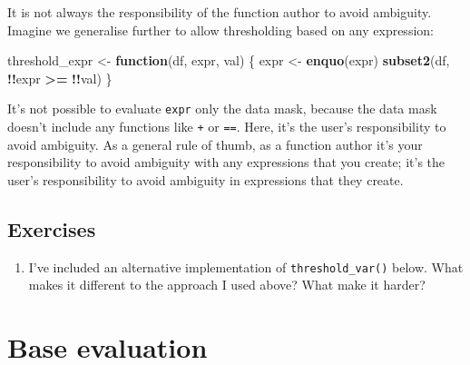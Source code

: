 \documentclass[]{book}
\newenvironment{Shaded}{\begin{snugshade}}{\end{snugshade}}
\newcommand{\ControlFlowTok}[1]{\textcolor[rgb]{0.27,0.27,0.27}{\textbf{#1}}}
\newcommand{\DataTypeTok}[1]{\textcolor[rgb]{0.27,0.27,0.27}{#1}}
\newcommand{\KeywordTok}[1]{\textcolor[rgb]{0.27,0.27,0.27}{\textbf{#1}}}
\newcommand{\NormalTok}[1]{#1}
\newcommand{\OperatorTok}[1]{\textcolor[rgb]{0.43,0.43,0.43}{\textbf{#1}}}
\newcommand{\StringTok}[1]{\textcolor[rgb]{0.5,0.5,0.5}{#1}}
\begin{document}
It is not always the responsibility of the function author to avoid ambiguity. Imagine we generalise further to allow thresholding based on any expression:

\begin{Shaded}
\begin{Highlighting}[]
\NormalTok{threshold_expr <-}\StringTok{ }\ControlFlowTok{function}\NormalTok{(df, expr, val) \{}
\NormalTok{  expr <-}\StringTok{ }\KeywordTok{enquo}\NormalTok{(expr)}
  \KeywordTok{subset2}\NormalTok{(df, }\OperatorTok{!!}\NormalTok{expr }\OperatorTok{>=}\StringTok{ }\OperatorTok{!!}\NormalTok{val)}
\NormalTok{\}}
\end{Highlighting}
\end{Shaded}

It's not possible to evaluate \texttt{expr} only the data mask, because the data mask doesn't include any functions like \texttt{+} or \texttt{==}. Here, it's the user's responsibility to avoid ambiguity. As a general rule of thumb, as a function author it's your responsibility to avoid ambiguity with any expressions that you create; it's the user's responsibility to avoid ambiguity in expressions that they create.

\hypertarget{exercises-12}{%
\subsection{Exercises}\label{exercises-12}}

\begin{enumerate}
\def\labelenumi{\arabic{enumi}.}
\item
  I've included an alternative implementation of \texttt{threshold\_var()} below.
  What makes it different to the approach I used above? What make it harder?

\begin{Shaded}
\end{Shaded}
\end{enumerate}

\hypertarget{base-evaluation}{%
\section{Base evaluation}\label{base-evaluation}}
\end{document}
